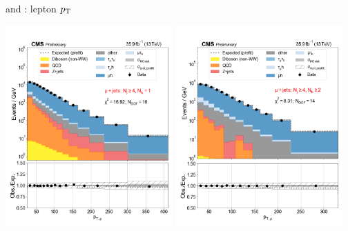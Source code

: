\begin{frame}{}
\begin{columns}
\begin{tcolorbox}[colframe=NUpurple]{ \ceh and \cmh: lepton $p_{\mathrm{T}}$}
\begin{center}
                \includegraphics[width=0.48\textwidth]{chapters/Analysis/sectionStatisticalAnalysis/figures/fit/mujet_cat_gt4_eq1}
                \includegraphics[width=0.48\textwidth]{chapters/Analysis/sectionStatisticalAnalysis/figures/fit/mujet_cat_gt4_gt2}
            \end{center}
        \end{tcolorbox}
    \end{columns}

\end{frame}

